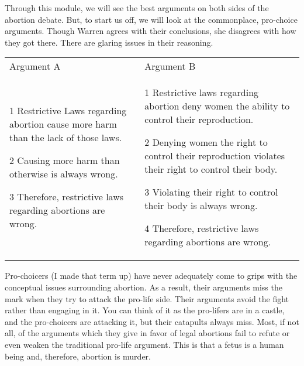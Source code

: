 Through this module, we will see the best arguments on both sides of the abortion debate. But, to start us off, we will look at the commonplace, pro-choice arguments. Though Warren agrees with their conclusions, she disagrees with how they got there. There are glaring issues in their reasoning. 
\noindent
\begin{tabular}{p{2.75in}|p{2.75in}}
Argument A&Argument B\\
    \begin{earg}
    \item[1] Restrictive Laws regarding abortion cause more harm than the lack of those laws.
    \item[2] Causing more harm than otherwise is always wrong.
    \item[3] Therefore, restrictive laws regarding abortions are wrong.
\end{earg}&\begin{earg}
    \item[1] Restrictive laws regarding abortion deny women the ability to control their reproduction.
    \item[2] Denying women the right to control their reproduction violates their right to control their body.
    \item[3] Violating their right to control their body is always wrong.
    \item[4] Therefore, restrictive laws regarding abortions are wrong.
\end{earg}\\
\end{tabular}
Pro-choicers (I made that term up) have never adequately come to grips with the conceptual issues surrounding abortion. As a result, their arguments miss the mark when they try to attack the pro-life side. Their arguments avoid the fight rather than engaging in it. You can think of it as the pro-lifers are in a castle, and the pro-choicers are attacking it, but their catapults always miss.  Most, if not all, of the arguments which they give in favor of legal abortions fail to refute or even weaken the traditional pro-life argument. This is that a fetus is a human being and, therefore, abortion is murder.

